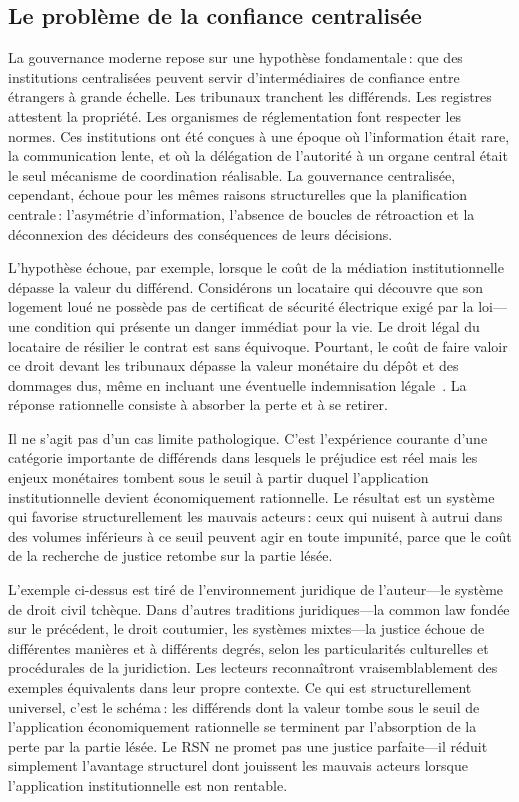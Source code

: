 \documentclass[11pt,a4paper,twocolumn]{article}
\begin{document}
\subsection{Le problème de la confiance centralisée}

La gouvernance moderne repose sur une hypothèse fondamentale\,: que des institutions centralisées peuvent servir d'intermédiaires de confiance entre étrangers à grande échelle. Les tribunaux tranchent les différends. Les registres attestent la propriété. Les organismes de réglementation font respecter les normes. Ces institutions ont été conçues à une époque où l'information était rare, la communication lente, et où la délégation de l'autorité à un organe central était le seul mécanisme de coordination réalisable. La gouvernance centralisée, cependant, échoue pour les mêmes raisons structurelles que la planification centrale\,: l'asymétrie d'information, l'absence de boucles de rétroaction et la déconnexion des décideurs des conséquences de leurs décisions.

L'hypothèse échoue, par exemple, lorsque le coût de la médiation institutionnelle dépasse la valeur du différend. Considérons un locataire qui découvre que son logement loué ne possède pas de certificat de sécurité électrique exigé par la loi---une condition qui présente un danger immédiat pour la vie. Le droit légal du locataire de résilier le contrat est sans équivoque. Pourtant, le coût de faire valoir ce droit devant les tribunaux dépasse la valeur monétaire du dépôt et des dommages dus, même en incluant une éventuelle indemnisation légale~\cite{czcourtfees}. La réponse rationnelle consiste à absorber la perte et à se retirer.

Il ne s'agit pas d'un cas limite pathologique. C'est l'expérience courante d'une catégorie importante de différends dans lesquels le préjudice est réel mais les enjeux monétaires tombent sous le seuil à partir duquel l'application institutionnelle devient économiquement rationnelle. Le résultat est un système qui favorise structurellement les mauvais acteurs\,: ceux qui nuisent à autrui dans des volumes inférieurs à ce seuil peuvent agir en toute impunité, parce que le coût de la recherche de justice retombe sur la partie lésée.

L'exemple ci-dessus est tiré de l'environnement juridique de l'auteur---le système de droit civil tchèque. Dans d'autres traditions juridiques---la common law fondée sur le précédent, le droit coutumier, les systèmes mixtes---la justice échoue de différentes manières et à différents degrés, selon les particularités culturelles et procédurales de la juridiction. Les lecteurs reconnaîtront vraisemblablement des exemples équivalents dans leur propre contexte. Ce qui est structurellement universel, c'est le schéma\,: les différends dont la valeur tombe sous le seuil de l'application économiquement rationnelle se terminent par l'absorption de la perte par la partie lésée. Le RSN ne promet pas une justice parfaite---il réduit simplement l'avantage structurel dont jouissent les mauvais acteurs lorsque l'application institutionnelle est non rentable.
\end{document}

